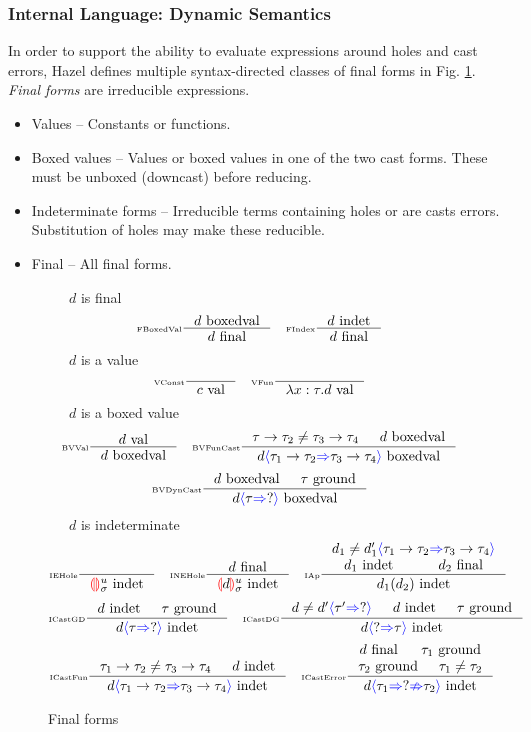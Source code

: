 \subsubsection{Internal Language: Dynamic Semantics}
In order to support the ability to evaluate expressions around holes and cast errors, Hazel defines multiple syntax-directed classes of final forms in Fig. \ref{fig:finalforms}. \textit{Final forms} are irreducible expressions.
\begin{itemize}
\item Values -- Constants or functions.
\item Boxed values -- Values or boxed values in one of the two cast forms. These must be unboxed (downcast) before reducing.
\item Indeterminate forms -- Irreducible terms containing holes or are casts errors. Substitution of holes may make these reducible.
\item Final -- All final forms.
\end{itemize}

\begin{figure}[h]
\small
\fbox{$\final$}\ \ \ $d$ is final
\tiny
\[\inference[\tiny FBoxedVal]{\boxedval}{\final}\quad
\inference[\tiny FIndex]{\indet}{\final}\]
\small
\fbox{$\val$}\ \ \ $d$ is a value
\tiny
\[\inference[\tiny VConst]{}{\val[c]}\quad
\inference[\tiny VFun]{}{\val[\lambda x:\tau. d]}\]
\small
\fbox{$\boxedval$}\ \ \ $d$ is a boxed value
\tiny
\[\inference[\tiny BVVal]{\val}{\boxedval}\quad
\inference[\tiny BVFunCast]{\tau \to \tau_2 \neq \tau_3 \to \tau_4 & \boxedval}{\boxedval[d\scast{\tau_1 \to \tau_2}{\tau_3 \to \tau_4}]}\]
\[\inference[\tiny BVDynCast]{\boxedval & \ground}{\boxedval[d\scast{\tau}{?}]}\]
\small
\fbox{$\indet$}\ \ \ $d$ is indeterminate
\tiny
\[\inference[\tiny IEHole]{}{\indet[\hole^u_\sigma]}\quad
\inference[\tiny INEHole]{\final}{\indet[{\hole[d]^u_\sigma}]}\quad
\inference[\tiny IAp]{d_1 \neq d_1'\scast{\tau_1 \to \tau_2}{\tau_3 \to \tau_4} \\ \indet[d_1] & \final[d_2]}{\indet[d_1(d_2)]}\]
\[\inference[\tiny ICastGD]{\indet & \ground}{\indet[d\scast{\tau}{?}]}\quad
\inference[\tiny ICastDG]{d \neq d'\scast{\tau'}{?} & \indet & \ground}{\indet[d\scast{?}{\tau}]}\]
\[\inference[\tiny ICastFun]{\tau_1 \to \tau_2 \neq \tau_3 \to \tau_4 & \indet}{\indet[d\scast{\tau_1 \to \tau_2}{\tau_3 \to \tau_4}]}\quad
\inference[\tiny ICastError]{\final & \ground[\tau_1] \\ \ground[\tau_2] & \tau_1 \neq \tau_2}{\indet[d\scasterror{\tau_1}{\tau_2}]}\]

\caption{Final forms}
\label{fig:finalforms}
\end{figure}


